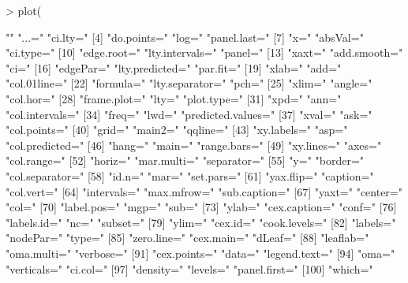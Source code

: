\documentclass[10pt,letterpaper]{article}
\begin{document}
\begin{Schunk}
\begin{Soutput}
> plot(
\end{Soutput}
\end{Schunk}
\begin{Schunk}
\begin{Soutput}
  [1] ""                  "...="              "ci.lty="          
  [4] "do.points="        "log="              "panel.last="      
  [7] "x="                "absVal="           "ci.type="         
 [10] "edge.root="        "lty.intervals="    "panel="           
 [13] "xaxt="             "add.smooth="       "ci="              
 [16] "edgePar="          "lty.predicted="    "par.fit="         
 [19] "xlab="             "add="              "col.01line="      
 [22] "formula="          "lty.separator="    "pch="             
 [25] "xlim="             "angle="            "col.hor="         
 [28] "frame.plot="       "lty="              "plot.type="       
 [31] "xpd="              "ann="              "col.intervals="   
 [34] "freq="             "lwd="              "predicted.values="
 [37] "xval="             "ask="              "col.points="      
 [40] "grid="             "main2="            "qqline="          
 [43] "xy.labels="        "asp="              "col.predicted="   
 [46] "hang="             "main="             "range.bars="      
 [49] "xy.lines="         "axes="             "col.range="       
 [52] "horiz="            "mar.multi="        "separator="       
 [55] "y="                "border="           "col.separator="   
 [58] "id.n="             "mar="              "set.pars="        
 [61] "yax.flip="         "caption="          "col.vert="        
 [64] "intervals="        "max.mfrow="        "sub.caption="     
 [67] "yaxt="             "center="           "col="             
 [70] "label.pos="        "mgp="              "sub="             
 [73] "ylab="             "cex.caption="      "conf="            
 [76] "labels.id="        "nc="               "subset="          
 [79] "ylim="             "cex.id="           "cook.levels="     
 [82] "labels="           "nodePar="          "type="            
 [85] "zero.line="        "cex.main="         "dLeaf="           
 [88] "leaflab="          "oma.multi="        "verbose="         
 [91] "cex.points="       "data="             "legend.text="     
 [94] "oma="              "verticals="        "ci.col="          
 [97] "density="          "levels="           "panel.first="     
[100] "which="           
\end{Soutput}
\end{Schunk}
\end{document}
